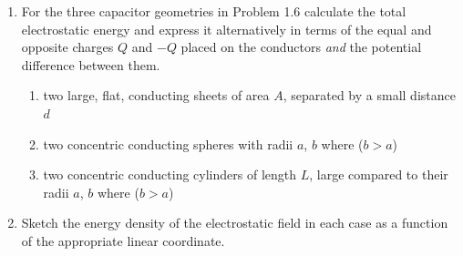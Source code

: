



\begin{question}

  
  \begin{enumerate}[label=(\alph*)]

  \item For the three capacitor geometries in Problem 1.6 calculate
    the total electrostatic energy and express it alternatively in
    terms of the equal and opposite charges $Q$ and $-Q$ placed on the
    conductors \emph{and} the potential difference between them.

    \begin{enumerate}[label=\roman*.]
    \item two large, flat, conducting sheets of area $A$, separated by
      a small distance $d$

    \item two concentric conducting spheres with radii $a$, $b$ where
      ($b > a$)

    \item two concentric conducting cylinders of length $L$, large
      compared to their radii $a$, $b$ where ($b > a$)

    \end{enumerate}

    
  \item Sketch the energy density of the electrostatic field in each
    case as a function of the appropriate linear coordinate.

  \end{enumerate}

\end{question}
